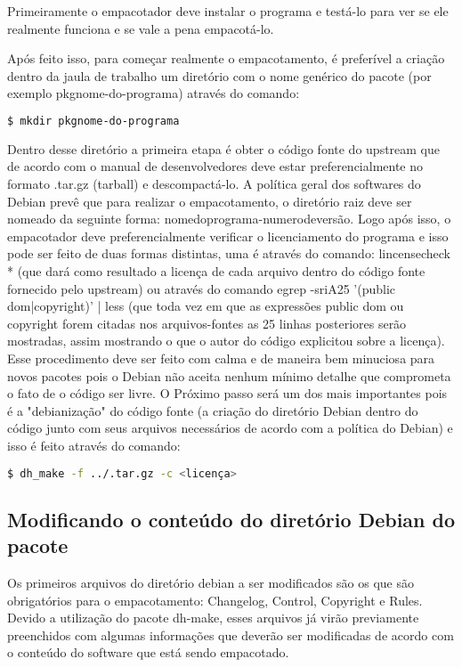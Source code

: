 Primeiramente o empacotador deve instalar o programa e testá-lo para ver se ele realmente funciona e se vale a pena empacotá-lo.

Após feito isso, para começar realmente o empacotamento, é preferível a criação dentro da jaula de trabalho um diretório com o nome genérico do pacote (por exemplo pkgnome-do-programa) através do comando:

\begin{lstlisting}[language=bash]
	$ mkdir pkgnome-do-programa 
\end{lstlisting} 

Dentro desse diretório a primeira etapa é obter o código fonte do upstream que de acordo com o manual de desenvolvedores deve estar preferencialmente no formato .tar.gz (tarball) e descompactá-lo. A política geral dos softwares do Debian prevê que para realizar o empacotamento, o diretório raiz deve ser nomeado da seguinte forma: nomedoprograma-numerodeversão. Logo após isso, o empacotador deve preferencialmente verificar o licenciamento do programa e isso pode ser feito de duas formas distintas, uma é através do comando: lincensecheck * (que dará como resultado a licença de cada arquivo dentro do código fonte fornecido pelo upstream) ou através do comando egrep -sriA25 '(public dom|copyright)' | less (que toda vez em que as expressões public dom ou copyright forem citadas nos arquivos-fontes as 25 linhas posteriores serão mostradas, assim mostrando o que o autor do código explicitou sobre a licença). Esse procedimento deve ser feito com calma e de maneira bem minuciosa para novos pacotes pois o Debian não aceita nenhum mínimo detalhe que comprometa o fato de o código ser livre.
O Próximo passo será um dos mais importantes pois é a "debianização" do código fonte (a criação do diretório Debian dentro do código junto com seus arquivos necessários de acordo com a política do Debian) e isso é feito através do comando:

\begin{lstlisting}[language=bash]
	$ dh_make -f ../.tar.gz -c <licença> 
\end{lstlisting} 

\subsection{Modificando o conteúdo do diretório Debian do pacote}

Os primeiros arquivos do diretório debian a ser modificados são os que são obrigatórios para o empacotamento: Changelog, Control, Copyright e Rules. Devido a utilização do pacote dh-make, esses arquivos já virão previamente preenchidos com algumas informações que deverão ser modificadas de acordo com o conteúdo do software que está sendo empacotado.

